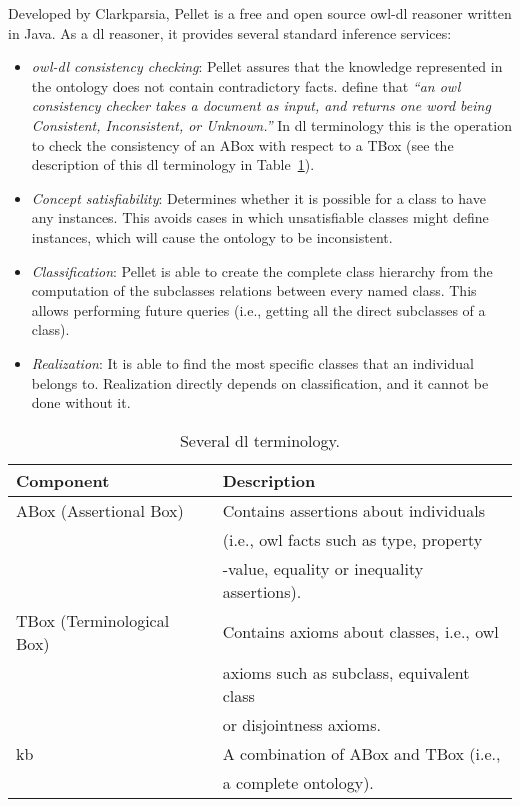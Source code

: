 Developed by Clarkparsia, Pellet is a free and open source \ac{owl}-\ac{dl}
reasoner written in Java. As a \ac{dl} reasoner, it provides several standard 
inference services:

\begin{itemize}
  \item \textit{\ac{owl}-\ac{dl} consistency checking}: Pellet assures that the 
  knowledge represented in the ontology does not contain contradictory facts. 
  \citet{carroll_owl_2004} define that \textit{``an \ac{owl} consistency checker 
  takes a document as input, and returns one word being Consistent, Inconsistent, 
  or Unknown.''} In \ac{dl} terminology  this is the operation to check the 
  consistency of an ABox with respect to a TBox (see the description of this 
  \ac{dl} terminology in Table~\ref{tbl:dl_terms}).
  
  \item \textit{Concept satisfiability}: Determines whether it is possible for 
  a class to have any instances. This avoids cases in which unsatisfiable classes 
  might define instances, which will cause the ontology to be inconsistent.
  
  \item \textit{Classification}: Pellet is able to create the complete class 
  hierarchy from the computation of the subclasses relations between every 
  named class. This allows performing future queries (i.e., getting all the 
  direct subclasses of a class).
  
  \item \textit{Realization}: It is able to find the most specific classes that 
  an individual belongs to. Realization directly depends on classification, and 
  it cannot be done without it.
\end{itemize}


\begin{table}[H]
  \caption{Several \ac{dl} terminology.}
 \label{tbl:dl_terms}
\footnotesize
\centering
 \begin{tabular}{l l}
  \hline 
  \textbf{Component} 		& \textbf{Description}				\\
  \hline
  ABox (Assertional Box)	& Contains assertions about individuals	\\
				& (i.e., \ac{owl} facts such  as type, property	\\
				& -value, equality or inequality assertions).	\\
  TBox (Terminological Box)	& Contains axioms about classes, i.e., \ac{owl}	\\
				& axioms such as subclass, equivalent class 	\\
				& or disjointness axioms.			\\
  \acl{kb}			& A combination of ABox and TBox (i.e.,		\\
				& a complete ontology).				\\
  \hline
  
\end{tabular}
\end{table}

